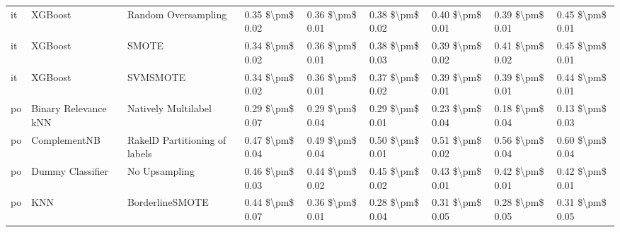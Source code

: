 \begin{tabular}{lllllllll}
      it &                         XGBoost &           Random Oversampling & 0.35 \$\textbackslash pm\$ 0.02 &           0.36 \$\textbackslash pm\$ 0.01 &       0.38 \$\textbackslash pm\$ 0.02 &        0.40 \$\textbackslash pm\$ 0.01 &                         0.39 \$\textbackslash pm\$ 0.01 &     0.45 \$\textbackslash pm\$ 0.01 \\
      it &                         XGBoost &                         SMOTE & 0.34 \$\textbackslash pm\$ 0.02 &           0.36 \$\textbackslash pm\$ 0.01 &       0.38 \$\textbackslash pm\$ 0.03 &        0.39 \$\textbackslash pm\$ 0.02 &                         0.41 \$\textbackslash pm\$ 0.02 &     0.45 \$\textbackslash pm\$ 0.01 \\
      it &                         XGBoost &                      SVMSMOTE & 0.34 \$\textbackslash pm\$ 0.02 &           0.36 \$\textbackslash pm\$ 0.01 &       0.37 \$\textbackslash pm\$ 0.02 &        0.39 \$\textbackslash pm\$ 0.01 &                         0.39 \$\textbackslash pm\$ 0.01 &     0.44 \$\textbackslash pm\$ 0.01 \\
      po &            Binary Relevance kNN &           Natively Multilabel & 0.29 \$\textbackslash pm\$ 0.07 &           0.29 \$\textbackslash pm\$ 0.04 &       0.29 \$\textbackslash pm\$ 0.01 &        0.23 \$\textbackslash pm\$ 0.04 &                         0.18 \$\textbackslash pm\$ 0.04 &     0.13 \$\textbackslash pm\$ 0.03 \\
      po &                    ComplementNB & RakelD Partitioning of labels & 0.47 \$\textbackslash pm\$ 0.04 &           0.49 \$\textbackslash pm\$ 0.04 &       0.50 \$\textbackslash pm\$ 0.01 &        0.51 \$\textbackslash pm\$ 0.02 &                         0.56 \$\textbackslash pm\$ 0.04 &     0.60 \$\textbackslash pm\$ 0.04 \\
      po &                Dummy Classifier &                 No Upsampling & 0.46 \$\textbackslash pm\$ 0.03 &           0.44 \$\textbackslash pm\$ 0.02 &       0.45 \$\textbackslash pm\$ 0.02 &        0.43 \$\textbackslash pm\$ 0.01 &                         0.42 \$\textbackslash pm\$ 0.01 &     0.42 \$\textbackslash pm\$ 0.01 \\
      po &                             KNN &               BorderlineSMOTE & 0.44 \$\textbackslash pm\$ 0.07 &           0.36 \$\textbackslash pm\$ 0.01 &       0.28 \$\textbackslash pm\$ 0.04 &        0.31 \$\textbackslash pm\$ 0.05 &                         0.28 \$\textbackslash pm\$ 0.05 &     0.31 \$\textbackslash pm\$ 0.05 \\

\end{tabular}
